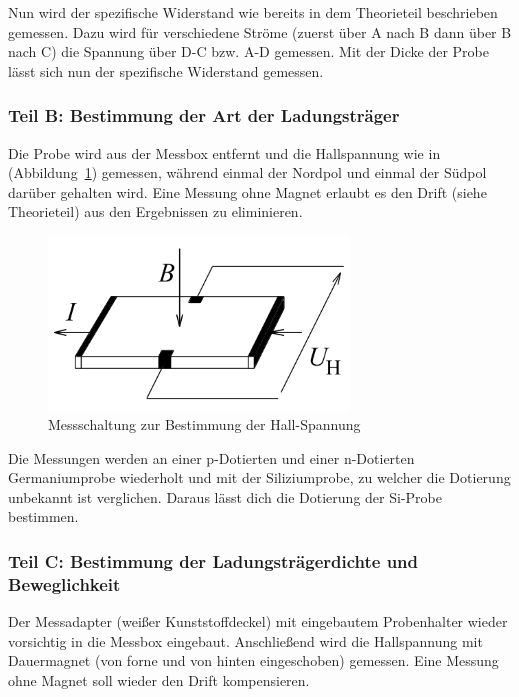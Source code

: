\documentclass[a4paper]{scrartcl}
\numberwithin{equation}{subsection}
\begin{document}
Nun wird der spezifische Widerstand wie bereits in dem Theorieteil beschrieben gemessen.
Dazu wird für verschiedene Ströme (zuerst über A nach B dann über B nach C) die Spannung über D-C bzw. A-D gemessen.
Mit der Dicke der Probe lässt sich nun der spezifische Widerstand gemessen.

\subsubsection{Teil B: Bestimmung der Art der Ladungsträger}

Die Probe wird aus der Messbox entfernt und die Hallspannung wie in (Abbildung~\ref{fig:messchaltung-hall}) gemessen, während einmal der Nordpol und einmal der Südpol darüber gehalten wird. Eine Messung ohne Magnet erlaubt es den Drift (siehe Theorieteil) aus den Ergebnissen zu eliminieren.

\begin{figure}[H]
\includegraphics[width=8cm]{messchaltung_hall}
\centering
\caption{Messschaltung zur Bestimmung der Hall-Spannung \protect\footnotemark}
\centering
\label{fig:messchaltung-hall}
\end{figure}


Die Messungen werden an einer p-Dotierten und einer n-Dotierten Germaniumprobe wiederholt und mit der Siliziumprobe, zu welcher die Dotierung unbekannt ist verglichen. Daraus lässt dich die Dotierung der Si-Probe bestimmen.

\subsubsection{Teil C: Bestimmung der Ladungsträgerdichte und Beweglichkeit}

Der Messadapter (weißer Kunststoffdeckel) mit eingebautem Probenhalter wieder vorsichtig in die Messbox eingebaut.
Anschließend wird die Hallspannung mit Dauermagnet (von forne und von hinten eingeschoben) gemessen.
Eine Messung ohne Magnet soll wieder den Drift kompensieren.\\
\end{document}
